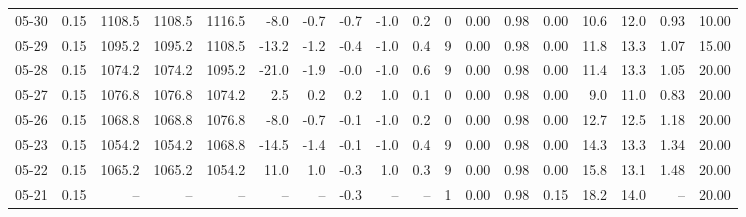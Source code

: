\begin{threeparttable}
{\begin{tabular}{lrrrrrrrrrrrrrrrrr}
  05-30 &     0.15 & 1108.5 & 1108.5 & 1116.5 &       -8.0 &           -0.7 &                      -0.7 &                     -1.0 &                 0.2 &              0 &       0.00 &      0.98 &           0.00 &             10.6 &                12.0 &            0.93 &                  10.00 \\
  05-29 &     0.15 & 1095.2 & 1095.2 & 1108.5 &      -13.2 &           -1.2 &                      -0.4 &                     -1.0 &                 0.4 &              9 &       0.00 &      0.98 &           0.00 &             11.8 &                13.3 &            1.07 &                  15.00 \\
  05-28 &     0.15 & 1074.2 & 1074.2 & 1095.2 &      -21.0 &           -1.9 &                      -0.0 &                     -1.0 &                 0.6 &              9 &       0.00 &      0.98 &           0.00 &             11.4 &                13.3 &            1.05 &                  20.00 \\
  05-27 &     0.15 & 1076.8 & 1076.8 & 1074.2 &        2.5 &            0.2 &                       0.2 &                      1.0 &                 0.1 &              0 &       0.00 &      0.98 &           0.00 &              9.0 &                11.0 &            0.83 &                  20.00 \\
  05-26 &     0.15 & 1068.8 & 1068.8 & 1076.8 &       -8.0 &           -0.7 &                      -0.1 &                     -1.0 &                 0.2 &              0 &       0.00 &      0.98 &           0.00 &             12.7 &                12.5 &            1.18 &                  20.00 \\
  05-23 &     0.15 & 1054.2 & 1054.2 & 1068.8 &      -14.5 &           -1.4 &                      -0.1 &                     -1.0 &                 0.4 &              9 &       0.00 &      0.98 &           0.00 &             14.3 &                13.3 &            1.34 &                  20.00 \\
  05-22 &     0.15 & 1065.2 & 1065.2 & 1054.2 &       11.0 &            1.0 &                      -0.3 &                      1.0 &                 0.3 &              9 &       0.00 &      0.98 &           0.00 &             15.8 &                13.1 &            1.48 &                  20.00 \\
  05-21 &     0.15 &     -- &     -- &     -- &         -- &             -- &                      -0.3 &                       -- &                  -- &              1 &       0.00 &      0.98 &           0.15 &             18.2 &                14.0 &              -- &                  20.00 \\

\end{tabular}}
\end{threeparttable}
